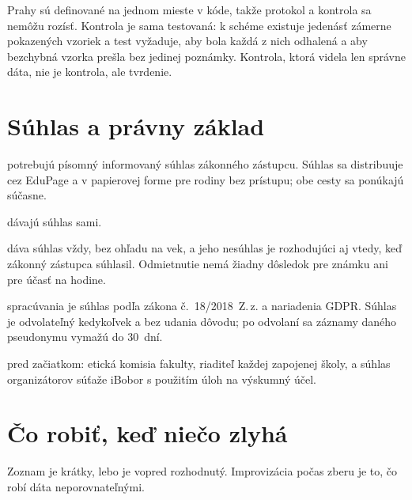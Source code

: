 Prahy sú definované na jednom mieste v kóde, takže protokol a kontrola sa nemôžu rozísť. Kontrola je sama testovaná: k schéme existuje jedenásť zámerne pokazených vzoriek a test vyžaduje, aby bola každá z nich odhalená a aby bezchybná vzorka prešla bez jedinej poznámky. Kontrola, ktorá videla len správne dáta, nie je kontrola, ale tvrdenie.

\section{Súhlas a právny základ}

\begin{description}[leftmargin=0.6cm, nosep]
    \item[\textbf{Žiaci do 18~rokov}] potrebujú písomný informovaný súhlas zákonného zástupcu. Súhlas sa distribuuje cez EduPage a v papierovej forme pre rodiny bez prístupu; obe cesty sa ponúkajú súčasne.
    \item[\textbf{Žiaci nad 18~rokov}] dávajú súhlas sami.
    \item[\textbf{Žiak sám}] dáva súhlas vždy, bez ohľadu na vek, a jeho nesúhlas je rozhodujúci aj vtedy, keď zákonný zástupca súhlasil. Odmietnutie nemá žiadny dôsledok pre známku ani pre účasť na hodine.
    \item[\textbf{Právny základ}] spracúvania je súhlas podľa zákona č.~18/2018~Z.\,z. a nariadenia GDPR. Súhlas je odvolateľný kedykoľvek a bez udania dôvodu; po odvolaní sa záznamy daného pseudonymu vymažú do 30~dní.
    \item[\textbf{Schválenia}] pred začiatkom: etická komisia fakulty, riaditeľ každej zapojenej školy, a súhlas organizátorov súťaže iBobor s použitím úloh na výskumný účel.
\end{description}

\section{Čo robiť, keď niečo zlyhá}

Zoznam je krátky, lebo je vopred rozhodnutý. Improvizácia počas zberu je to, čo robí dáta neporovnateľnými.

